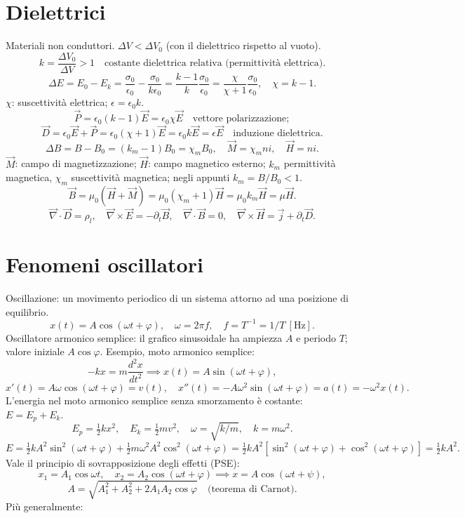 \documentclass[11pt,a4paper]{article}
\newcommand{\pagina}[1]{\clearpage}
\newcommand{\vv}[1]{\vec{#1}}
\begin{document}
\section*{Dielettrici}
Materiali non conduttori. $\Delta V<\Delta V_0$ (con il dielettrico rispetto al vuoto).
\[k=\frac{\Delta V_0}{\Delta V}>1\quad\text{costante dielettrica relativa (permittività elettrica)}.\]
\[\Delta E=E_0-E_k=\frac{\sigma_0}{\epsilon_0}-\frac{\sigma_0}{k\epsilon_0}=\frac{k-1}{k}\frac{\sigma_0}{\epsilon_0}=\frac\chi{\chi+1}\frac{\sigma_0}{\epsilon_0},\quad\chi=k-1.\]
$\chi$: suscettività elettrica; $\epsilon=\epsilon_0k$.
\[\vv P=\epsilon_0(k-1)\vv E=\epsilon_0\chi\vv E\quad\text{vettore polarizzazione};\]
\[\vv D=\epsilon_0\vv E+\vv P=\epsilon_0(\chi+1)\vv E=\epsilon_0k\vv E=\epsilon\vv E\quad\text{induzione dielettrica}.\]
\[\Delta B=B-B_0=(k_m-1)B_0=\chi_m B_0,\quad\vv M=\chi_mni,\quad\vv H=ni.\]
$\vv M$: campo di magnetizzazione; $\vv H$: campo magnetico esterno; $k_m$ permittività magnetica, $\chi_m$ suscettività magnetica; negli appunti $k_m=B/B_0<1$.
\[\vv B=\mu_0(\vv H+\vv M)=\mu_0(\chi_m+1)\vv H=\mu_0k_m\vv H=\mu\vv H.\]
\[\vv\nabla\cdot\vv D=\rho_l,\quad\vv\nabla\times\vv E=-\partial_t\vv B,\quad\vv\nabla\cdot\vv B=0,\quad\vv\nabla\times\vv H=\vv j+\partial_t\vv D.\]
\pagina{5}\section*{Fenomeni oscillatori}
Oscillazione: un movimento periodico di un sistema attorno ad una posizione di equilibrio.
\[x(t)=A\cos(\omega t+\varphi),\quad\omega=2\pi f,\quad f=T^{-1}=1/T\ [\mathrm{Hz}].\]
Oscillatore armonico semplice: il grafico sinusoidale ha ampiezza $A$ e periodo $T$; valore iniziale $A\cos\varphi$.
Esempio, moto armonico semplice:
\[-kx=m\frac{d^2x}{dt^2}\implies x(t)=A\sin(\omega t+\varphi),\]
\[x'(t)=A\omega\cos(\omega t+\varphi)=v(t),\quad x''(t)=-A\omega^2\sin(\omega t+\varphi)=a(t)=-\omega^2x(t).\]
L'energia nel moto armonico semplice senza smorzamento è costante: $E=E_p+E_k$.
\[E_p=\tfrac12kx^2,\quad E_k=\tfrac12mv^2,\quad\omega=\sqrt{k/m},\quad k=m\omega^2.\]
\[E=\tfrac12kA^2\sin^2(\omega t+\varphi)+\tfrac12m\omega^2A^2\cos^2(\omega t+\varphi)=\tfrac12kA^2[\sin^2(\omega t+\varphi)+\cos^2(\omega t+\varphi)]=\tfrac12kA^2.\]
Vale il principio di sovrapposizione degli effetti (PSE):
\[x_1=A_1\cos\omega t,\quad x_2=A_2\cos(\omega t+\varphi)\implies x=A\cos(\omega t+\psi),\]
\[A=\sqrt{A_1^2+A_2^2+2A_1A_2\cos\varphi}\quad\text{(teorema di Carnot)}.\]
\pagina{6}
Più generalmente:
\end{document}
